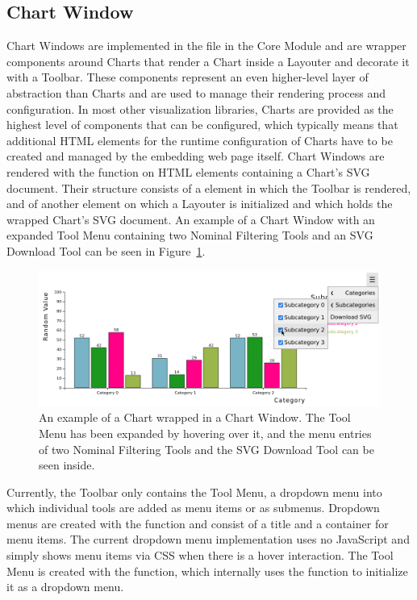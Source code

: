 \subsection{Chart Window}

Chart Windows are implemented in the  file in
the Core Module and are wrapper components around Charts that render a
Chart inside a Layouter and decorate it with a Toolbar. These
components represent an even higher-level layer of abstraction than
Charts and are used to manage their rendering process and
configuration. In most other visualization libraries, Charts are
provided as the highest level of components that can be configured,
which typically means that additional HTML elements for the runtime
configuration of Charts have to be created and managed by the
embedding web page itself.  Chart Windows are rendered with the
 function on HTML  elements
containing a Chart's SVG document.  Their structure consists of a
 element in which the Toolbar is rendered, and of another
 element on which a Layouter is initialized and which
holds the wrapped Chart's SVG document. An example of a Chart Window
with an expanded Tool Menu containing two Nominal Filtering Tools and
an SVG Download Tool can be seen in Figure~\ref{fig:ChartWindow}.


\begin{figure}[tp]
\centering
\includegraphics[keepaspectratio,width=\linewidth,height=\fullh]
{images/chart-window.png}
\caption[Chart Window Example]{%
An example of a Chart wrapped in a Chart Window. The Tool
Menu has been expanded by hovering over it, and the menu entries of
two Nominal Filtering Tools and the SVG Download Tool can be seen
inside. 
}
\label{fig:ChartWindow}
\end{figure}


Currently, the Toolbar only contains the Tool Menu, a dropdown menu
into which individual tools are added as menu items or as submenus.
Dropdown menus are created with the  function
and consist of a title and a container for menu items. The current
dropdown menu implementation uses no JavaScript and simply shows menu
items via CSS when there is a hover interaction. The Tool Menu is
created with the  function, which internally
uses the  function to initialize it as a
dropdown menu.

